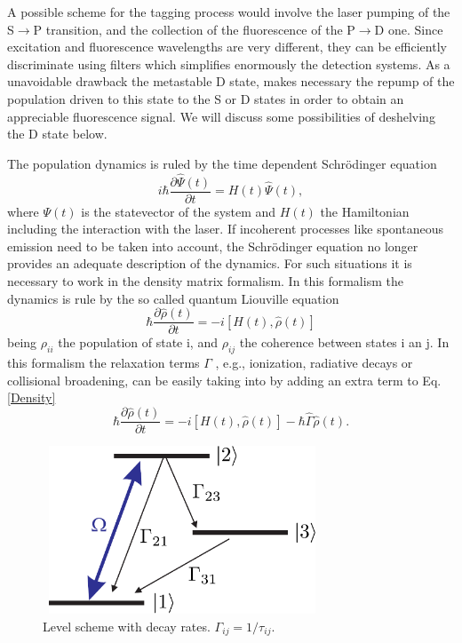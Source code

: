 A possible scheme for the tagging process would involve the laser pumping of the S$\rightarrow$P transition, and the collection of the fluorescence of the P$\rightarrow$D one. Since excitation and fluorescence wavelengths are very different, they can be efficiently discriminate using filters which simplifies enormously the detection systems. As a unavoidable drawback the metastable D state, makes necessary the repump of the population driven to this state to the S or D states in order to obtain an appreciable fluorescence signal.  We will discuss some possibilities of deshelving the D state below. 

The population dynamics is ruled by the time dependent Schr\"odinger equation 
\begin{equation}
\label{Schr}
 i\hbar\frac{\partial\hat{\Psi}(t)}{\partial t}=H(t)\hat{\Psi}(t),
\end{equation}
where $\Psi(t)$ is the statevector of the system and $H(t)$ the
Hamiltonian including the interaction with the laser. If incoherent processes like spontaneous emission need to be taken into account, the Schr\"odinger equation no longer provides an adequate description of the dynamics. For such situations it is necessary to work in the density matrix formalism. In this formalism the dynamics is rule by the so called quantum Liouville equation \cite{Sh90}
\begin{equation}
\label{Density}
 \hbar\frac{\partial\hat{\rho}(t)}{\partial t}=-i\left[H(t), \hat{\rho}(t)\right]
\end{equation}
being $\rho_{ii}$ the population of state i, and $\rho_{ij}$ the coherence between states i an j. In this formalism the relaxation terms $\Gamma$ , e.g., ionization, radiative decays or collisional broadening, can be easily taking into by adding an extra term to Eq.\,\ref{Density}
\begin{equation}
\label{Density}
 \hbar\frac{\partial\hat{\rho}(t)}{\partial t}=-i\left[H(t), \hat{\rho}(t)\right]-\hbar\hat{\Gamma}\hat{\rho}(t).
\end{equation}

\begin{figure}[ht!]
\begin{center}
\includegraphics[width=8.3cm, height=5cm]{imgs/levelscheme2.pdf}
\caption{\label{levelscheme2} Level scheme with decay rates. $\Gamma_{ij}=1/\tau_{ij}$.}
\end{center}
\end{figure}

